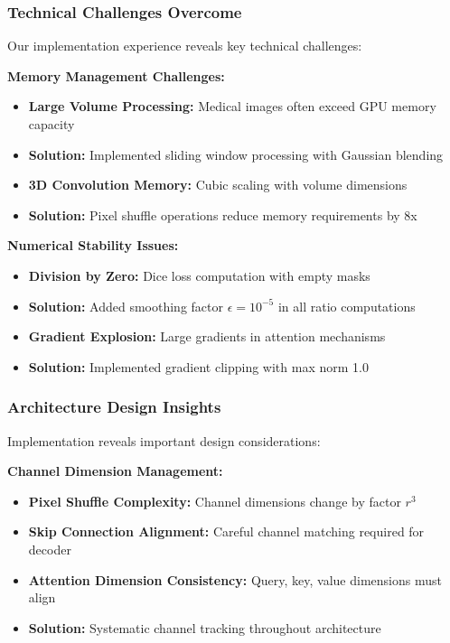 \subsubsection*{Technical Challenges Overcome}
Our implementation experience reveals key technical challenges:

\textbf{Memory Management Challenges:}
\begin{itemize}
    \item \textbf{Large Volume Processing:} Medical images often exceed GPU memory capacity
    \item \textbf{Solution:} Implemented sliding window processing with Gaussian blending
    \item \textbf{3D Convolution Memory:} Cubic scaling with volume dimensions
    \item \textbf{Solution:} Pixel shuffle operations reduce memory requirements by 8x
\end{itemize}

\textbf{Numerical Stability Issues:}
\begin{itemize}
    \item \textbf{Division by Zero:} Dice loss computation with empty masks
    \item \textbf{Solution:} Added smoothing factor $\epsilon = 10^{-5}$ in all ratio computations
    \item \textbf{Gradient Explosion:} Large gradients in attention mechanisms
    \item \textbf{Solution:} Implemented gradient clipping with max norm 1.0
\end{itemize}

\subsubsection*{Architecture Design Insights}
Implementation reveals important design considerations:

\textbf{Channel Dimension Management:}
\begin{itemize}
    \item \textbf{Pixel Shuffle Complexity:} Channel dimensions change by factor $r^3$
    \item \textbf{Skip Connection Alignment:} Careful channel matching required for decoder
    \item \textbf{Attention Dimension Consistency:} Query, key, value dimensions must align
    \item \textbf{Solution:} Systematic channel tracking throughout architecture
\end{itemize}

